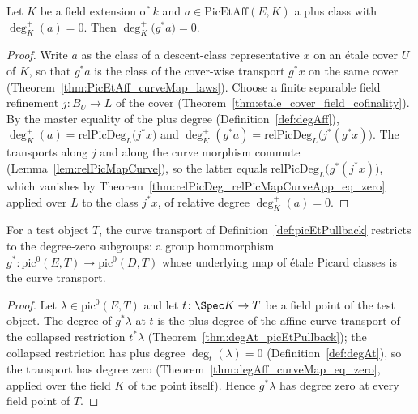 \begin{theorem}
  \label{thm:degAff_curveMap_eq_zero}
  \leanok
  Let \(K\) be a field extension of \(k\) and \(a \in \mathrm{PicEtAff}(E, K)\) a plus
  class with \(\deg^{+}_K(a) = 0\). Then \(\deg^{+}_K\bigl(g^{*}a\bigr) = 0\).
\end{theorem}
\begin{proof}
  \leanok
  Write \(a\) as the class of a descent-class representative \(x\) on an \'etale cover
  \(U\) of \(K\), so that \(g^{*}a\) is the class of the cover-wise transport
  \(g^{*}x\) on the same cover (Theorem~\ref{thm:PicEtAff_curveMap_laws}). Choose a
  finite separable field refinement \(j \colon B_U \to L\) of the cover
  (Theorem~\ref{thm:etale_cover_field_cofinality}). By the master equality of the plus
  degree (Definition~\ref{def:degAff}),
  \(\deg^{+}_K(a) = \mathrm{relPicDeg}_L\bigl(j^{*}x\bigr)\) and
  \(\deg^{+}_K(g^{*}a) = \mathrm{relPicDeg}_L\bigl(j^{*}(g^{*}x)\bigr)\). The
  transports along \(j\) and along the curve morphism commute
  (Lemma~\ref{lem:relPicMapCurve}), so the latter equals
  \(\mathrm{relPicDeg}_L\bigl(g^{*}(j^{*}x)\bigr)\), which vanishes by
  Theorem~\ref{thm:relPicDeg_relPicMapCurveApp_eq_zero} applied over \(L\) to the class
  \(j^{*}x\), of relative degree \(\deg^{+}_K(a) = 0\).
\end{proof}

\begin{definition}
  \label{def:pic0Pullback}
  \leanok
  For a test object \(T\), the curve transport of Definition~\ref{def:picEtPullback}
  restricts to the degree-zero subgroups: a group homomorphism
  \(g^{*} \colon \mathrm{pic}^0(E, T) \to \mathrm{pic}^0(D, T)\) whose underlying map
  of \'etale Picard classes is the curve transport.
\end{definition}
\begin{proof}
  \leanok
  Let \(\lambda \in \mathrm{pic}^0(E,T)\) and let \(t \colon \Spec K \to T\) be a field
  point of the test object. The degree of \(g^{*}\lambda\) at \(t\) is the plus degree
  of the affine curve transport of the collapsed restriction \(t^{*}\lambda\)
  (Theorem~\ref{thm:degAt_picEtPullback}); the collapsed restriction has plus degree
  \(\deg_t(\lambda) = 0\) (Definition~\ref{def:degAt}), so the transport has degree
  zero (Theorem~\ref{thm:degAff_curveMap_eq_zero}, applied over the field \(K\) of the
  point itself). Hence \(g^{*}\lambda\) has degree zero at every field point of \(T\).
\end{proof}

